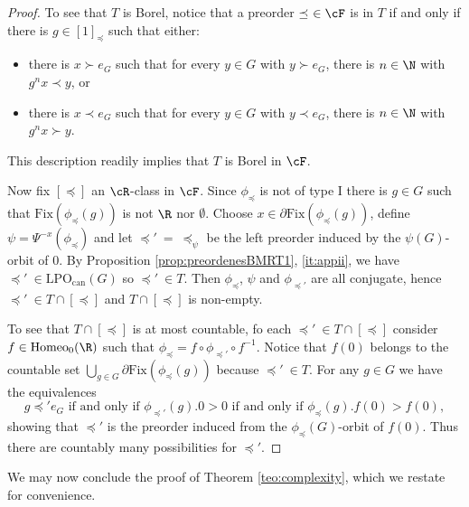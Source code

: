 \documentclass[reqno]{amsart}
\begin{document}
\begin{proof}
To see that $T$ is Borel, notice that a preorder $\preceq \ \in \cF$ is in $T$ if and only if there is $g \in [1]_\preceq$ such that either:
\begin{itemize}
	\item there is $x \succ e_G$ such that for every $y \in G$ with $y \succ e_G$, there is $n \in \N$ with $g^nx \prec y$, or
	\item there is $x \prec e_G$ such that for every $y \in G$ with $y \prec e_G$, there is $n \in \N$ with $g^nx \succ y$.
\end{itemize}
This description readily implies that $T$ is Borel in $\cF$. 

Now fix $[\preceq]$ an $\cR$-class in $\cF$. Since $\phi_\preceq$ is not of type I there is $g \in G$ such that $\mathrm{Fix}(\phi_\preceq(g))$ is not $\R$ nor $\emptyset$. Choose $x \in \partial \mathrm{Fix}(\phi_\preceq(g))$, define $\psi = \Psi^{-x}(\phi_\preceq)$ and let $\preceq' \ = \ \preceq_\psi$ be the left preorder induced by the $\psi(G)$-orbit of 0. By Proposition \ref{prop:preordenesBMRT1}, \eqref{it:appii}, we have $\preceq' \ \in \mathrm{LPO}_\mathrm{can}(G)$ so $\preceq' \ \in T$. Then $\phi_\preceq$, $\psi$ and $\phi_{\preceq'}$ are all conjugate, hence $\preceq' \ \in T \cap [\preceq]$ and $T \cap [\preceq]$ is non-empty.

To see that $T \cap [\preceq]$ is at most countable, fo each $\preceq' \ \in T \cap [\preceq]$ consider $f \in \mathrm{Homeo}_0(\R)$ such that $\phi_\preceq = f \circ \phi_{\preceq'} \circ f^{-1}$. Notice that $f(0)$ belongs to the countable set $\bigcup_{g \in G} \partial \mathrm{Fix}(\phi_{\preceq}(g))$ because $\preceq' \ \in T$. For any $g \in G$ we have the equivalences
\[
	g \preceq' e_G \text{ if and only if }\phi_{\preceq'}(g).0 > 0 \text{ if and only if } \phi_\preceq(g).f(0) > f(0),
\]
showing that $\preceq'$ is the preorder induced from the $\phi_\preceq(G)$-orbit of $f(0)$. Thus there are countably many possibilities for $\preceq'$.
\end{proof}

We may now conclude the proof of Theorem \ref{teo:complexity}, which we restate for convenience.
\end{document}
